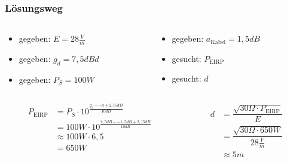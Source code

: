 \begin{frame}
\frametitle{Lösungsweg}
\begin{columns}
    \begin{column}{0.48\textwidth}
    \begin{itemize}
  \item gegeben: $E = 28\frac{V}{m}$
  \item gegeben: $g_d = 7,5dBd$
  \item gegeben: $P_S = 100W$
  \end{itemize}

    \end{column}
   \begin{column}{0.48\textwidth}
       \begin{itemize}
  \item gegeben: $a_{\textrm{Kabel}} = 1,5dB$
  \item gesucht: $P_{\textrm{EIRP}}$
  \item gesucht: $d$
  \end{itemize}

   \end{column}
\end{columns}
\begin{columns}
    \begin{column}{0.48\textwidth}
    
    \pause
    \begin{equation}\begin{split} \nonumber P_{\textrm{EIRP}} &= P_S \cdot 10^{\frac{g_d -- a + 2,15dB}{10dB}}\\ &= 100W \cdot 10^{\frac{7,5dB -- 1,5dB + 2,15dB}{10dB}}\\ &\approx 100W \cdot 6,5\\ &= 650W \end{split}\end{equation}




    \end{column}
   \begin{column}{0.48\textwidth}
       
    \pause
    \begin{equation}\begin{split} \nonumber d &= \dfrac{\sqrt{30\Omega \cdot P_{\textrm{EIRP}}}}{E}\\ &= \dfrac{\sqrt{30\Omega \cdot 650W}}{28\frac{V}{m}}\\ &\approx 5m \end{split}\end{equation}




   \end{column}
\end{columns}

\end{frame}

